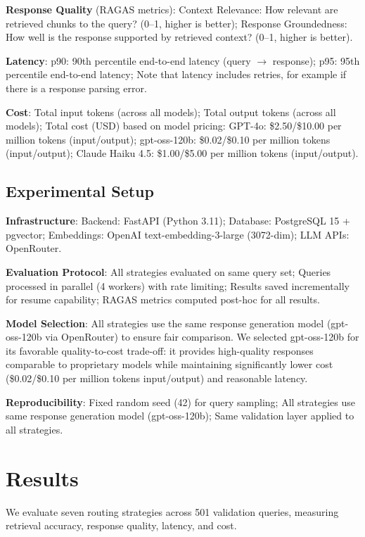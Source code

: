 \documentclass[twocolumn,10pt]{article}
\begin{document}
\textbf{Response Quality} (RAGAS metrics): Context Relevance: How relevant are retrieved chunks to the query? (0--1, higher is better); Response Groundedness: How well is the response supported by retrieved context? (0--1, higher is better).

\textbf{Latency}: p90: 90th percentile end-to-end latency (query $\rightarrow$ response); p95: 95th percentile end-to-end latency; Note that latency includes retries, for example if there is a response parsing error.

\textbf{Cost}: Total input tokens (across all models); Total output tokens (across all models); Total cost (USD) based on model pricing: GPT-4o: \$2.50/\$10.00 per million tokens (input/output); gpt-oss-120b: \$0.02/\$0.10 per million tokens (input/output); Claude Haiku 4.5: \$1.00/\$5.00 per million tokens (input/output).

\subsection{Experimental Setup}

\textbf{Infrastructure}: Backend: FastAPI (Python 3.11); Database: PostgreSQL 15 + pgvector; Embeddings: OpenAI text-embedding-3-large (3072-dim); LLM APIs: OpenRouter.

\textbf{Evaluation Protocol}: All strategies evaluated on same query set; Queries processed in parallel (4 workers) with rate limiting; Results saved incrementally for resume capability; RAGAS metrics computed post-hoc for all results.

\textbf{Model Selection}: All strategies use the same response generation model (gpt-oss-120b via OpenRouter) to ensure fair comparison. We selected gpt-oss-120b for its favorable quality-to-cost trade-off: it provides high-quality responses comparable to proprietary models while maintaining significantly lower cost (\$0.02/\$0.10 per million tokens input/output) and reasonable latency.

\textbf{Reproducibility}: Fixed random seed (42) for query sampling; All strategies use same response generation model (gpt-oss-120b); Same validation layer applied to all strategies.

\section{Results}

We evaluate seven routing strategies across 501 validation queries, measuring retrieval accuracy, response quality, latency, and cost.
\end{document}
